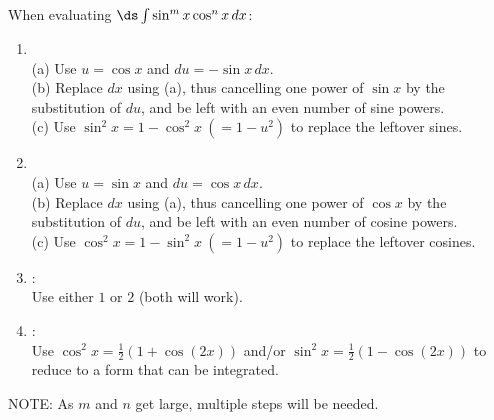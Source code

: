\begin{formulabox}
	When evaluating $\ds\int\sin^mx \cos^nx\,dx$:  
	\begin{enumerate}
	\item {}\\  
		(a) Use $u=\cos x$ and $du=-\sin x\,dx$.\\  
		(b) Replace $dx$ using (a), thus cancelling one power of $\sin x$ by the substitution of $du$, and be left with an even number of sine powers.\\  
		(c) Use $\sin^2x=1-\cos^2x~(=1-u^2)$ to replace the leftover sines.  
	\item {}\\  
		(a) Use $u=\sin x$ and $du=\cos x\,dx$.\\  
		(b) Replace $dx$ using (a), thus cancelling one power of $\cos x$ by the substitution of $du$, and be left with an even number of cosine powers.\\  
		(c) Use $\cos^2x=1-\sin^2x~(=1-u^2)$ to replace the leftover cosines.	  
	\item {}:\\ Use either $1$ or $2$ (both will work).  
	\item {}:\\  
	 Use $\cos^2x=\frac{1}{2}\left(1+\cos(2x)\right)$ and/or $\sin^2x=\frac{1}{2}\left(1-\cos(2x)\right)$ to reduce to a form that can be integrated.
	\end{enumerate}
	NOTE: As $m$ and $n$ get large, multiple steps will be needed.
\end{formulabox}




